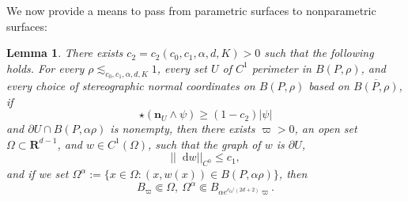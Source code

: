 \documentclass[reqno,10pt]{amsart}
\newcommand{\RR}{\mathbf{R}}
\newcommand*\dif{\mathop{}\!\mathrm{d}}
\newcommand{\normal}{\mathbf n}
\newtheorem{lemma}[theorem]{Lemma}
\theoremstyle{definition}
\numberwithin{equation}{section}
\begin{document}
We now provide a means to pass from parametric surfaces to nonparametric surfaces:

\begin{lemma}\label{rep as a good graph}
There exists $c_2 = c_2(c_0, c_1, \alpha, d, K) > 0$ such that the following holds.
For every $\rho \lesssim_{c_0, c_1, \alpha, d, K} 1$, every set $U$ of $C^1$ perimeter in $B(P, \rho)$, and every choice of stereographic normal coordinates on $B(P, \rho)$ based on $\overline{B(P, \rho)}$, if
\begin{equation}\label{rep as a good graph hyp}
\star(\normal_U \wedge \psi) \geq (1 - c_2)|\psi|
\end{equation}
and $\partial U \cap B(P, \alpha \rho)$ is nonempty, then there exists $\varpi > 0$, an open set $\Omega \subset \RR^{d - 1}$, and $w \in C^1(\Omega)$, such that the graph of $w$ is $\partial U$,
\begin{equation}\label{rep as a good graph small derivative}
||\dif w||_{C^0} \leq c_1,
\end{equation}
and if we set $\Omega^\alpha := \{x \in \Omega: (x, w(x)) \in B(P, \alpha \rho)\}$, then
\begin{equation}\label{rep as a good graph set nests}
B_\varpi \Subset \Omega, ~\Omega^\alpha \Subset B_{\alpha e^{c_0/(2d + 2)} \varpi}.
\end{equation}
\end{lemma}
\end{document}
